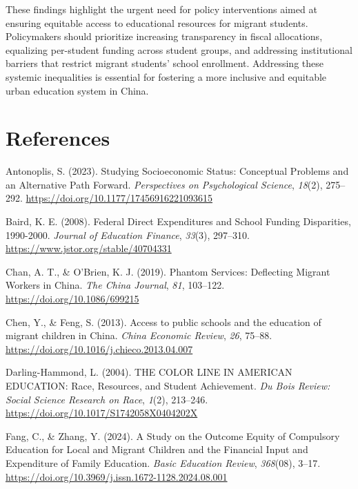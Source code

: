 \documentclass[
  man,
  floatsintext,
  longtable,
  nolmodern,
  notxfonts,
  notimes,
  colorlinks=true,linkcolor=blue,citecolor=blue,urlcolor=blue]{apa7}
\newlength{\cslhangindent}
\newenvironment{CSLReferences}[2] %
 {\begin{list}{}{%
  \setlength{\itemindent}{0pt}
  \setlength{\leftmargin}{0pt}
  \setlength{\parsep}{0pt}
  \ifodd #1
   \setlength{\leftmargin}{\cslhangindent}
   \setlength{\itemindent}{-1\cslhangindent}
  \fi
  \setlength{\itemsep}{#2\baselineskip}}}
 {\end{list}}
\begin{document}
These findings highlight the urgent need for policy interventions aimed
at ensuring equitable access to educational resources for migrant
students. Policymakers should prioritize increasing transparency in
fiscal allocations, equalizing per-student funding across student
groups, and addressing institutional barriers that restrict migrant
students' school enrollment. Addressing these systemic inequalities is
essential for fostering a more inclusive and equitable urban education
system in China.

\clearpage

\section{References}\label{references}

\label{refs}
\begin{CSLReferences}{1}{0}
Antonoplis, S. (2023). Studying {Socioeconomic Status}: {Conceptual
Problems} and an {Alternative Path Forward}. \emph{Perspectives on
Psychological Science}, \emph{18}(2), 275--292.
\url{https://doi.org/10.1177/17456916221093615}

Baird, K. E. (2008). Federal {Direct Expenditures} and {School Funding
Disparities}, 1990-2000. \emph{Journal of Education Finance},
\emph{33}(3), 297--310. \url{https://www.jstor.org/stable/40704331}

Chan, A. T., \& O'Brien, K. J. (2019). Phantom {Services}: {Deflecting
Migrant Workers} in {China}. \emph{The China Journal}, \emph{81},
103--122. \url{https://doi.org/10.1086/699215}

Chen, Y., \& Feng, S. (2013). Access to public schools and the education
of migrant children in {China}. \emph{China Economic Review}, \emph{26},
75--88. \url{https://doi.org/10.1016/j.chieco.2013.04.007}

Darling-Hammond, L. (2004). {THE COLOR LINE IN AMERICAN EDUCATION}:
{Race}, {Resources}, and {Student Achievement}. \emph{Du Bois Review:
Social Science Research on Race}, \emph{1}(2), 213--246.
\url{https://doi.org/10.1017/S1742058X0404202X}

Fang, C., \& Zhang, Y. (2024). {A Study on the Outcome Equity of
Compulsory Education for Local and Migrant Children and the Financial
Input and Expenditure of Family Education}. \emph{Basic Education
Review}, \emph{368}(08), 3--17.
\url{https://doi.org/10.3969/j.issn.1672-1128.2024.08.001}


\end{CSLReferences}
\end{document}
